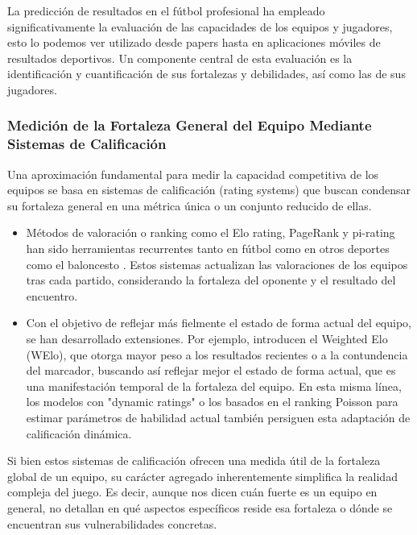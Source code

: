 La predicción de resultados en el fútbol profesional ha empleado significativamente la evaluación de las capacidades de los equipos y jugadores, esto lo podemos ver utilizado desde papers hasta en aplicaciones móviles de resultados deportivos. Un componente central de esta evaluación es la identificación y cuantificación de sus fortalezas y debilidades, así como las de sus jugadores.

\subsubsection{Medición de la Fortaleza General del Equipo Mediante Sistemas de Calificación}

Una aproximación fundamental para medir la capacidad competitiva de los equipos se basa en sistemas de calificación (rating systems) que buscan condensar su fortaleza general en una métrica única o un conjunto reducido de ellas.

\begin{itemize}

    \item Métodos de valoración o ranking como el Elo rating, PageRank y pi-rating han sido herramientas recurrentes tanto en fútbol \cite{macleanReviewNFL20192022, owenDynamicBayesianForecasting2011, luizFootballUnpredictablePredicting2024} como en otros deportes como el baloncesto \cite{lampisPredictionsEuropeanBasketball2023}. Estos sistemas actualizan las valoraciones de los equipos tras cada partido, considerando la fortaleza del oponente y el resultado del encuentro.

    \item Con el objetivo de reflejar más fielmente el estado de forma actual del equipo, se han desarrollado extensiones. Por ejemplo, \cite{angeliniWeightedEloRating2022} introducen el Weighted Elo (WElo), que otorga mayor peso a los resultados recientes o a la contundencia del marcador, buscando así reflejar mejor el estado de forma actual, que es una manifestación temporal de la fortaleza del equipo. En esta misma línea, los modelos con "dynamic ratings" \cite{holmesForecastingFootballMatch2024} o los basados en el ranking Poisson para estimar parámetros de habilidad actual \cite{leyRankingSoccerTeams2019} también persiguen esta adaptación de calificación dinámica.
\end{itemize}

Si bien estos sistemas de calificación ofrecen una medida útil de la fortaleza global de un equipo, su carácter agregado inherentemente simplifica la realidad compleja del juego. Es decir, aunque nos dicen cuán fuerte es un equipo en general, no detallan en qué aspectos específicos reside esa fortaleza o dónde se encuentran sus vulnerabilidades concretas.

